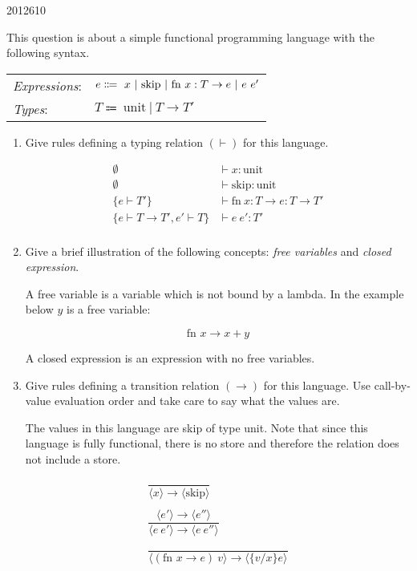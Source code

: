 \documentclass[10pt,\jkfside,a4paper]{article}
\begin{document}
\begin{examquestion}{2012}{6}{10}

This question is about a simple functional programming language with the
following syntax.

\begin{table}[H]
\centering
\begin{tabular}{l l}
\textit{Expressions}: & $e \Coloneqq \ x \ | \ \text{skip} \ | \ \text{fn} \
\vspace{0.5em}
x : T \to e \ | \ e \ e'$\\
\textit{Types}: & $T \Coloneqq \ \text{unit} \ | \ T \to T'$\\
\end{tabular}
\end{table}

\begin{enumerate}[label=(\alph*)]

\item Give rules defining a typing relation $(\vdash)$ for this language.

\[
\begin{split}
\emptyset&\vdash x : \text{unit} \\
\emptyset&\vdash \text{skip}: \text{unit} \\
\{e\vdash T'\}&\vdash \text{fn} \ x : T \to e: T \to T' \\
\{e\vdash T \to T', e' \vdash T\}&\vdash e \ e': T' \\
\end{split}
\]

\item Give a brief illustration of the following concepts: \textit{free
variables} and \textit{closed expression}.

A free variable is a variable which is not bound by a lambda. In the example
below $y$ is a free variable:

\[
\text{fn } x \to x + y
\]

A closed expression is an expression with no free variables.

\item Give rules defining a transition relation $(\to)$ for this
language. Use call-by-value evaluation order and take care to say what the
values are.

The values in this language are skip of type unit. Note that since this
language is fully functional, there is no store and therefore the relation
does not include a store.

\begin{gather*}
\dfrac{}{\langle x \rangle \to \langle \text{skip} \rangle} \\\\
\dfrac{ \langle e' \rangle \to \langle e'' \rangle }{ \langle e \ e'  \rangle \to \langle e \ e'' \rangle } \\\\
\dfrac{}{ \langle (\text{fn } x \to e) \ v \rangle \to
\langle \{v / x\}e \rangle }\\
\end{gather*}

\end{enumerate}

\end{examquestion}
\end{document}

